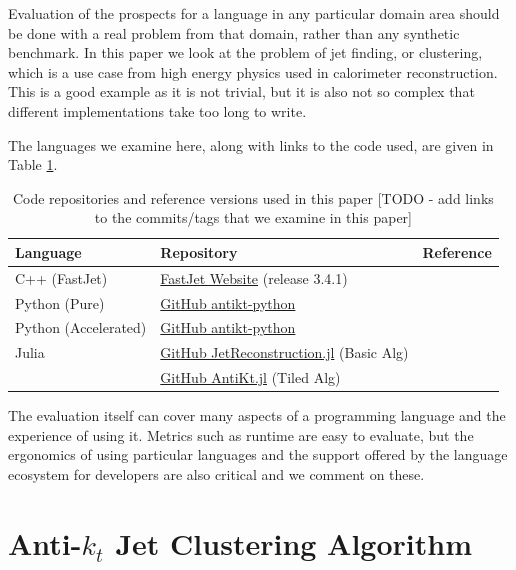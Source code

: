 \documentclass{webofc}
\begin{document}
Evaluation of the prospects for a language in any particular domain area should
be done with a real problem from that domain, rather than any synthetic
benchmark. In this paper we look at the problem of jet finding, or clustering,
which is a use case from high energy physics used in calorimeter reconstruction.
This is a good example as it is not trivial, but it is also not so complex that
different implementations take too long to write.

The languages we examine here, along with links to the code used, are given in
Table \ref{tab:versions}.

\begin{table}
  \begin{center}
    \begin{tabular}{l|l|l}
      \textbf{Language} & \textbf{Repository} & \textbf{Reference}\\
      \hline
      C++ (FastJet) & \href{https://fastjet.fr/}{FastJet Website} (release 3.4.1) \\
      Python (Pure) & \href{https://github.com/graeme-a-stewart/antikt-python}{GitHub antikt-python} \\
      Python (Accelerated) & \href{https://github.com/graeme-a-stewart/antikt-python}{GitHub antikt-python} \\
      Julia & \href{https://github.com/JuliaHEP/JetReconstruction.jl}{GitHub JetReconstruction.jl} (Basic Alg) \\
       & \href{https://github.com/grasph/AntiKt.jl}{GitHub AntiKt.jl} (Tiled Alg) \\
    \end{tabular}
    \caption{Code repositories and reference versions used in this paper [TODO - add links to the commits/tags that we examine in this paper]}
    \label{tab:versions}
  \end{center}
\end{table}

The evaluation itself can cover many aspects of a programming language and the
experience of using it. Metrics such as runtime are easy to evaluate, but the
ergonomics of using particular languages and the support offered by the language
ecosystem for developers are also critical and we comment on these.

\section{Anti-$k_t$ Jet Clustering Algorithm}
\label{sec:antikt}
\end{document}
